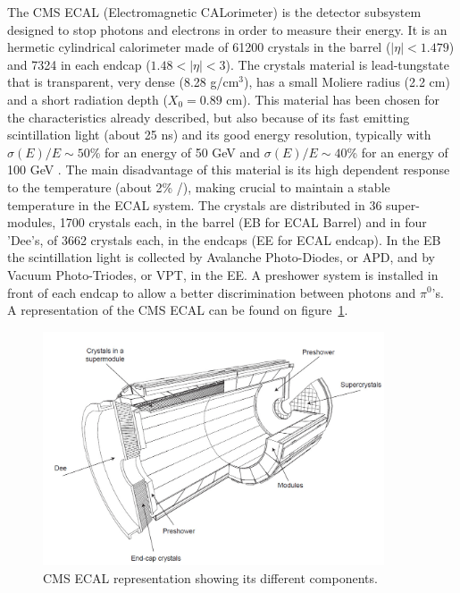 The CMS ECAL (Electromagnetic CALorimeter) is the detector subsystem designed to stop photons and electrons in order to measure their energy. It is an hermetic cylindrical calorimeter made of 61200 crystals in the barrel ($|\eta|<1.479$) and 7324 in each endcap ($1.48<|\eta|<3$). The crystals material is lead-tungstate that is transparent, very dense (8.28 g/$\text{cm}^{3}$), has a small Moliere radius (2.2 cm) and a short radiation depth ($X_{0}=0.89$ cm). This material has been chosen for the characteristics already described, but also because of its fast emitting scintillation light (about 25 ns) and its good energy resolution, typically with $\sigma(E)/E\sim 50$\% for an energy of 50 GeV and $\sigma(E)/E\sim 40$\% for an energy of 100 GeV . The main disadvantage of this material is its high dependent response to the temperature (about 2\% /\celsius), making crucial to maintain a stable temperature in the ECAL system. The crystals are distributed in 36 super-modules, 1700 crystals each, in the barrel (EB for ECAL Barrel) and in four 'Dee's, of 3662 crystals each, in the endcaps (EE for ECAL endcap). In the EB the scintillation light is collected by Avalanche Photo-Diodes, or APD, and by Vacuum Photo-Triodes, or VPT, in the EE. A preshower system is installed in front of each endcap to allow a better discrimination between photons and $\pi^{0}$'s. A representation of the CMS ECAL can be found on figure~\ref{fig:ecal}.

\begin{figure}[!Hhtbp]
  \begin{center}
    \includegraphics[width=0.9\textwidth]{figs/ECAL.png}
    \caption{CMS ECAL representation showing its different components. }
    \label{fig:ecal}
  \end{center}
\end{figure}

